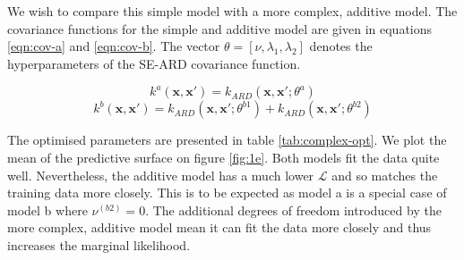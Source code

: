\documentclass[]{article}
\newcommand{\Lcal}{\mathcal{L}}
\begin{document}
We wish to compare this simple model with a more complex, additive model. The covariance functions for the simple and additive model are given in equations \ref{eqn:cov-a} and \ref{eqn:cov-b}. The vector $\theta = [\nu, \lambda_1, \lambda_2]$ denotes the hyperparameters of the SE-ARD covariance function.

\begin{equation}
k^a(\mathbf{x}, \mathbf{x}') = k_{ARD}(\mathbf{x}, \mathbf{x}' ; \theta^a)
\label{eqn:cov-a}
\end{equation}
\begin{equation}
k^b(\mathbf{x}, \mathbf{x}') = k_{ARD}(\mathbf{x}, \mathbf{x}' ; \theta^{b1})
+ k_{ARD}(\mathbf{x}, \mathbf{x}' ; \theta^{b2})
\label{eqn:cov-b}
\end{equation}

The optimised parameters are presented in table \ref{tab:complex-opt}. We plot the mean of the predictive surface on figure \ref{fig:1e}. Both models fit the data quite well. Nevertheless, the additive model has a much lower $\Lcal$ and so matches the training data more closely. This is to be expected as model a is a special case of model b where $\nu^{(b2)}=0$. The additional degrees of freedom introduced by the more complex, additive model mean it can fit the data more closely and thus increases the marginal likelihood.
\end{document}
